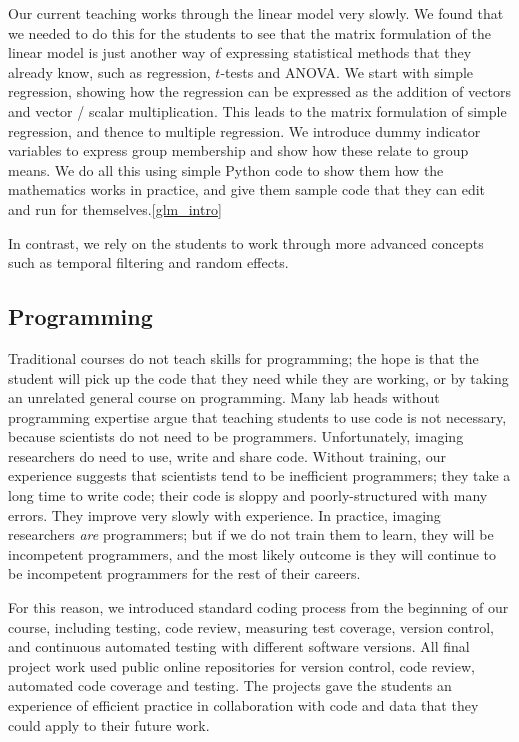 Our current teaching works through the linear model very slowly. We found that
we needed to do this for the students to see that the matrix formulation of
the linear model is just another way of expressing statistical methods that
they already know, such as regression, $t$-tests and ANOVA.  We start with
simple regression, showing how the regression can be expressed as the addition
of vectors and vector / scalar multiplication.  This leads to the matrix
formulation of simple regression, and thence to multiple regression.  We
introduce dummy indicator variables to express group membership and show how
these relate to group means.  We do all this using simple Python code to show
them how the mathematics works in practice, and give them sample code that
they can edit and run for themselves.\cref{glm_intro}

In contrast, we rely on the students to work through more advanced concepts
such as temporal filtering and random effects.

\subsection{Programming}

Traditional courses do not teach skills for programming; the hope is that the
student will pick up the code that they need while they are working, or by
taking an unrelated general course on programming.  Many lab heads without
programming expertise argue that teaching students to use code is not
necessary, because scientists do not need to be programmers.  Unfortunately,
imaging researchers do need to use, write and share code.  Without training,
our experience suggests that scientists tend to be inefficient programmers;
they take a long time to write code; their code is sloppy and
poorly-structured with many errors.  They improve very slowly with experience.
In practice, imaging researchers {\em are} programmers; but if we do not train
them to learn, they will be incompetent programmers, and the most likely
outcome is they will continue to be incompetent programmers for the rest of
their careers.

For this reason, we introduced standard coding process from the beginning of
our course, including testing, code review, measuring test coverage, version
control, and continuous automated testing with different software versions.
All final project work used public online repositories for version control,
code review, automated code coverage and testing.  The projects gave the
students an experience of efficient practice in collaboration with code and
data that they could apply to their future work.

